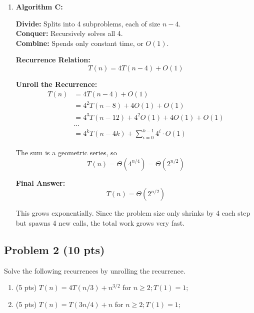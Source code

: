 \documentclass[12pt]{article}
\begin{document}
\begin{enumerate}[label=(\alph*)]
    \item \textbf{Algorithm C:}
    
    \textbf{Divide:} Splits into 4 subproblems, each of size \(n - 4\).\\
    \textbf{Conquer:} Recursively solves all 4.\\
    \textbf{Combine:} Spends only constant time, or \(O(1)\).
    
    \textbf{Recurrence Relation:}
    \[
    T(n) = 4T(n - 4) + O(1)
    \]
    
    \textbf{Unroll the Recurrence:}
    \begin{align*}
    T(n) &= 4T(n - 4) + O(1) \\
         &= 4^2 T(n - 8) + 4O(1) + O(1) \\
         &= 4^3 T(n - 12) + 4^2O(1) + 4O(1) + O(1) \\
         &\dots \\
         &= 4^k T(n - 4k) + \sum_{i=0}^{k-1} 4^i \cdot O(1)
    \end{align*}
    
    The sum is a geometric series, so
    \[
    T(n) = \Theta(4^{n/4}) = \Theta\left(2^{n/2}\right)
    \]
    
    \textbf{Final Answer:}
    \[
    \boxed{T(n) = \Theta(2^{n/2})}
    \]
    
    This grows exponentially. Since the problem size only shrinks by 4 each step but spawns 4 new calls, the total work grows very fast.
\end{enumerate}

\subsection*{Problem 2 (10 pts)}
Solve the following recurrences by unrolling the recurrence.
\begin{enumerate}[label=(\alph*)]
    \item (5 pts) $T(n) = 4T(n/3) + n^{3/2}$ for $n\ge2; T(1)=1;$
    \item (5 pts) $T(n) = T(3n/4) + n$ for $n \ge 2; T(1)=1;$
\end{enumerate}
\end{document}
